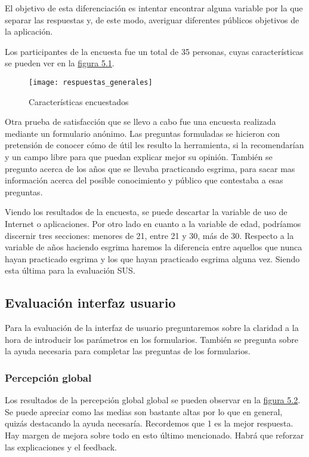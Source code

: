 El objetivo de esta diferenciación es intentar encontrar alguna variable por la que separar
las respuestas y, de este modo, averiguar diferentes públicos objetivos de la aplicación.

Los participantes de la encuesta fue un total de 35 personas, cuyas características se pueden ver en la \hyperref[fig:Características encuestados]{figura 5.1}.

\begin{figure}[htb]
	\centering
	\texttt{[image: respuestas\_generales]}
	\caption[Características encuestados]{Características encuestados}
	\label{fig:Características encuestados}
\end{figure}

Otra prueba de satisfacción que se llevo a cabo fue una encuesta realizada mediante un formulario
anónimo. Las preguntas formuladas se hicieron con pretensión de conocer cómo de útil les resulto
la herramienta, si la recomendarían y un campo libre para que puedan explicar mejor su opinión.
También se pregunto acerca de los años que se llevaba practicando esgrima, para sacar mas información
acerca del posible conocimiento y público que contestaba a esas preguntas.



Viendo los resultados de la encuesta, se puede descartar la variable de uso de Internet o aplicaciones.
Por otro lado en cuanto a la variable de edad, podríamos discernir tres secciones: menores de 21, entre 21
y 30, más de 30. Respecto a la variable de años haciendo esgrima haremos la diferencia entre aquellos
que nunca hayan practicado esgrima y los que hayan practicado esgrima alguna vez. Siendo esta última
para la evaluación SUS.

\subsection{Evaluación interfaz usuario}

Para la evaluación de la interfaz de usuario preguntaremos sobre la claridad a la hora de introducir
los parámetros en los formularios. También se pregunta sobre la ayuda necesaria para completar las preguntas de los formularios.

\subsubsection{Percepción global}

Los resultados de la percepción global global se pueden observar en la \hyperref[fig:Percepción global de interfaz]{figura 5.2}. Se puede apreciar
como las medias son bastante altas por lo que en general, quizás destacando la ayuda necesaría.
Recordemos que 1 es la mejor respuesta. Hay margen de mejora sobre todo en esto último mencionado.
Habrá que reforzar las explicaciones y el feedback.

